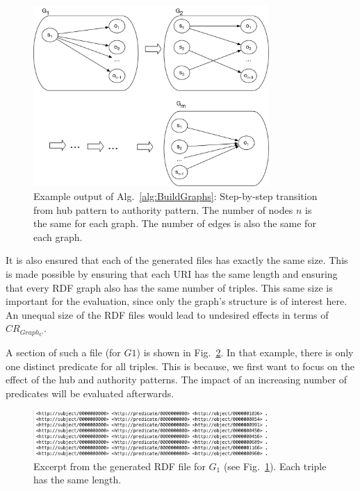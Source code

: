 \begin{figure}[h]
	\centering
	\includegraphics[width=0.8\textwidth]{figures/GRPvsHDT/starpattern.pdf}
	\caption{Example output of Alg.~\ref{alg:BuildGraphs}: Step-by-step transition from hub pattern to authority pattern. The number of nodes $n$ is the same for each graph. The number of edges is also the same for each graph.}
	\label{fig:star_pattern}
\end{figure}

It is also ensured that each of the generated files has exactly the same size. This is made possible by ensuring that each URI has the same length and ensuring that every RDF graph also has the same number of triples. This same size is important for the evaluation, since only the graph's structure is of interest here. An unequal size of the RDF files would lead to undesired effects in terms of $CR_{Graph_C}$.

A section of such a file (for $G1$) is shown in Fig.~\ref{fig:rdfFile}. In that example, there is only one distinct predicate for all triples. This is because, we first want to focus on the effect of the hub and authority patterns. The impact of an increasing number of predicates will be evaluated afterwards.


\begin{figure}[h]
	\centering
	\includegraphics[width=0.8\textwidth]{figures/GRPvsHDT/file.png}
	\caption{Excerpt from the generated RDF file for $G_1$ (see Fig.~\ref{fig:star_pattern}). Each triple has the same length.}
	\label{fig:rdfFile}
\end{figure}

